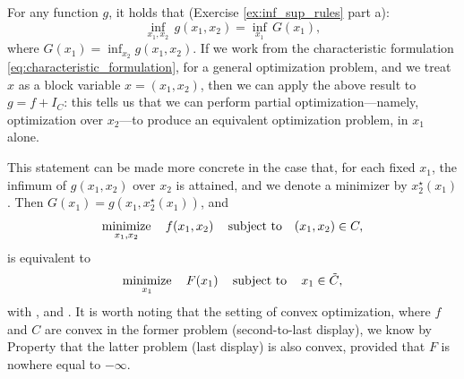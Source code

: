 For any function $g$, it holds that (Exercise \ref{ex:inf_sup_rules} part a):
\[
\inf_{x_1, x_2} \, g(x_1, x_2) = \inf_{x_1} \, G(x_1), 
\]
where $G(x_1) = \inf_{x_2} g(x_1,x_2)$. If we work from the characteristic
formulation \eqref{eq:characteristic_formulation}, for a general optimization
problem, and we treat $x$ as a block variable $x=(x_1,x_2)$, then we can apply
the above result to $g = f + I_C$: this tells us that we can perform
partial optimization---namely, optimization over $x_2$---to produce an
equivalent optimization problem, in $x_1$ alone. 

This statement can be made more concrete in the case that, for each fixed $x_1$,
the infimum of $g(x_1,x_2)$ over $x_2$ is attained, and we denote a
minimizer by $x^\star_2(x_1)$. Then $G(x_1) = g(x_1, x^\star_2(x_1))$, and 
\[
\operatorname*{minimize}_{x_1,x_2} \quad f(x_1, x_2) \quad \operatorname{subject\,\,to} \quad (x_1,x_2) \in C, 
\]
is equivalent to 
\[
\operatorname*{minimize}_{x_1} \quad F(x_1) \quad \operatorname{subject\,\,to} \quad x_1 \in \tilde{C},
\]
with , and . It is worth noting that the setting of convex
optimization, where $f$ and $C$ are convex in the former problem (second-to-last  
display), we know by Property  that the latter
problem (last display) is also convex, provided that $F$ is nowhere equal to
$-\infty$.  

